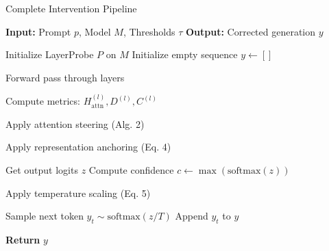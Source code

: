 \documentclass[11pt]{article}
\begin{document}
\begin{algorithm}
\caption{Complete Intervention Pipeline}
\begin{algorithmic}[1]
\State \textbf{Input:} Prompt $p$, Model $M$, Thresholds $\tau$
\State \textbf{Output:} Corrected generation $y$

\State Initialize LayerProbe $P$ on $M$
\State Initialize empty sequence $y \leftarrow []$

    \State Forward pass through layers

        \State Compute metrics: $H_{\text{attn}}^{(l)}, D^{(l)}, C^{(l)}$

            \State Apply attention steering (Alg. 2)
        \EndIf

            \State Apply representation anchoring (Eq. 4)
        \EndIf
    \EndFor

    \State Get output logits $z$
    \State Compute confidence $c \leftarrow \max(\text{softmax}(z))$

        \State Apply temperature scaling (Eq. 5)
    \EndIf

    \State Sample next token $y_t \sim \text{softmax}(z / T)$
    \State Append $y_t$ to $y$
\EndFor

\State \textbf{Return} $y$
\end{algorithmic}
\end{algorithm}
\end{document}

